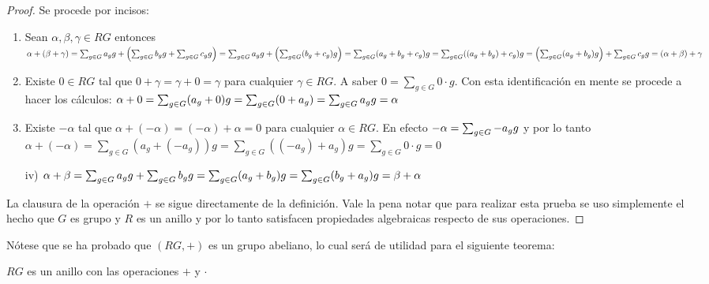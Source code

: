 \begin{proof}
Se procede por incisos:
\begin{enumerate}
\item  Sean $\alpha, \beta, \gamma \in RG$ entonces $\alpha+(\beta+\gamma)=\sum_{g \in G} a_{g} g+\left(\sum_{g \in G} b_{g} g+ \sum_{g \in G} c_{g} g \right)= \sum_{g \in G} a_{g} g+\left(\sum_{g\in G}(b_g+c_g)g\right)=\sum_{g\in G}(a_g+b_g+c_g)g= \sum_{g\in G}((a_g+b_g)+c_g)g=\left(\sum_{g\in G}(a_g+b_g)g \right) +\sum_{g \in G} c_{g} g=(\alpha+\beta)+\gamma $

\item Existe $0 \in RG$ tal que $0+\gamma=\gamma+0=\gamma$ para cualquier $\gamma \in RG$. A saber $0=\sum_{g \in G}0\cdot g$. Con esta identificación en mente se procede a hacer los cálculos: $\alpha + 0 = \sum_{g \in G}(a_g+0)g=\sum_{g\in G}(0+a_g)=\sum_{g \in G} a_{g} g=\alpha$

\item Existe $-\alpha$ tal que $\alpha+(-\alpha)= (-\alpha)+\alpha =0$ para cualquier $\alpha \in RG$. En efecto $-\alpha = \sum_{g \in G} -a_{g} g$ y por lo tanto $\alpha+ (-\alpha)=\sum_{g\in G}(a_g+(-a_g) )g= \sum_{g\in G}((-a_g)+a_g)g = \sum_{g \in G}0\cdot g = 0 $

\item[iv)] $\alpha + \beta = \sum_{g \in G} a_{g} g+\sum_{g \in G} b_{g} g=\sum_{g \in G}(a_g+b_g)g= \sum_{g \in G}(b_g+a_g)g=\beta + \alpha $ \qedhere
\end{enumerate}

La clausura de la operación $+$  se sigue directamente de la definición. Vale la pena notar que para realizar esta prueba se uso simplemente el hecho que $G$ es grupo y $R$ es un anillo y por lo tanto satisfacen propiedades algebraicas respecto de sus operaciones.
\end{proof}

Nótese que se ha probado que $(RG,+)$ es un grupo abeliano, lo cual será de utilidad para el siguiente teorema:

\begin{teorema}
$RG$ es un anillo con las operaciones $+$ y $\cdot$
\end{teorema}


